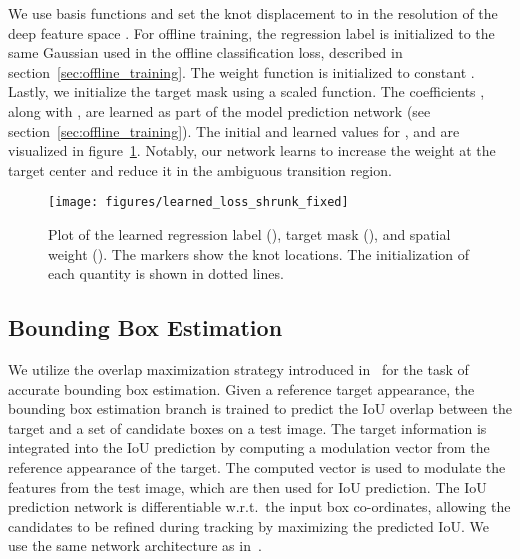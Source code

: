 \documentclass[10pt,twocolumn,letterpaper]{article}
\begin{document}
We use  basis functions and set the knot displacement to  in the resolution of the deep feature space . For offline training, the regression label  is initialized to the same Gaussian  used in the offline classification loss, described in section~\ref{sec:offline_training}. The weight function  is initialized to constant . Lastly, we initialize the target mask  using a scaled  function. The coefficients , along with , are learned as part of the model prediction network  (see section~\ref{sec:offline_training}). The initial and learned values for ,  and  are visualized in figure~\ref{fig:learned_loss_shrunk}. Notably, our network learns to increase the weight  at the target center and reduce it in the ambiguous transition region.


\begin{figure}[t]
	\centering \newcommand{\wid}{0.6\columnwidth}\texttt{[image: figures/learned\_loss\_shrunk\_fixed]}\vspace{0mm}\caption{Plot of the learned regression label (), target mask (), and spatial weight (). The markers show the knot locations. The initialization of each quantity is shown in dotted lines.}\label{fig:learned_loss_shrunk}\vspace{-3mm}\end{figure}

\subsection{Bounding Box Estimation}
We utilize the overlap maximization strategy introduced in~\cite{ATOM} for the task of accurate bounding box estimation. 
Given a reference target appearance, the bounding box estimation branch is trained to predict the IoU overlap between the target and a set of 
candidate boxes on a test image. The target information is integrated into the IoU prediction by computing a modulation vector from the reference appearance of the target. The computed vector is used to modulate the features from the test image, which are then used for IoU prediction. The IoU prediction network is differentiable w.r.t.\ the input box co-ordinates, allowing the candidates to be refined during tracking by maximizing the predicted IoU. We use the same network architecture as in~\cite{ATOM}.
\end{document}
